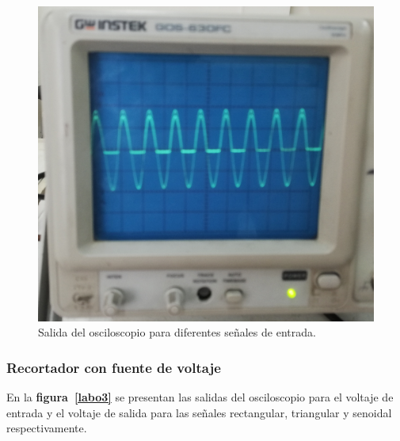 \documentclass[letter,twoside,11pt]{article}
\begin{document}
\begin{figure}[!h]
\includegraphics[scale=0.070]{fotos/labo1.4.eps}
\caption{Salida del osciloscopio para diferentes señales de entrada.}
\label{labo2}
\end{figure}

\subsubsection{Recortador con fuente de voltaje}
En la \textbf{figura~\ref{labo3}} se presentan las salidas del osciloscopio para
el voltaje de entrada y el voltaje de salida para las señales rectangular,
triangular y senoidal respectivamente.
\end{document}
